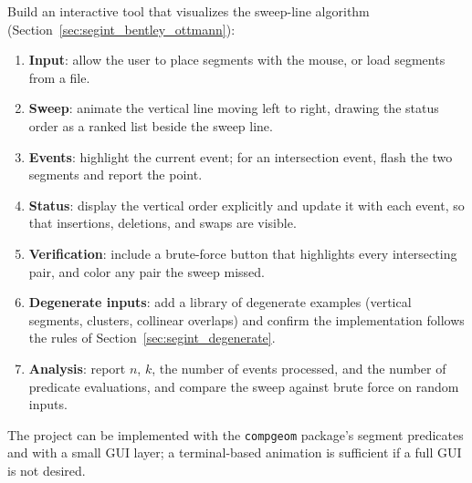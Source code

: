 Build an interactive tool that visualizes the sweep-line algorithm
(Section~\ref{sec:segint_bentley_ottmann}):
\begin{enumerate}
  \item \textbf{Input}: allow the user to place segments with the mouse, or
    load segments from a file.
  \item \textbf{Sweep}: animate the vertical line moving left to right,
    drawing the status order as a ranked list beside the sweep line.
  \item \textbf{Events}: highlight the current event; for an intersection
    event, flash the two segments and report the point.
  \item \textbf{Status}: display the vertical order explicitly and update
    it with each event, so that insertions, deletions, and swaps are
    visible.
  \item \textbf{Verification}: include a brute-force button that highlights
    every intersecting pair, and color any pair the sweep missed.
  \item \textbf{Degenerate inputs}: add a library of degenerate examples
    (vertical segments, clusters, collinear overlaps) and confirm the
    implementation follows the rules of Section~\ref{sec:segint_degenerate}.
  \item \textbf{Analysis}: report $n$, $k$, the number of events processed,
    and the number of predicate evaluations, and compare the sweep against
    brute force on random inputs.
\end{enumerate}
The project can be implemented with the \texttt{compgeom} package's segment
predicates and with a small GUI layer; a terminal-based animation is
sufficient if a full GUI is not desired.
